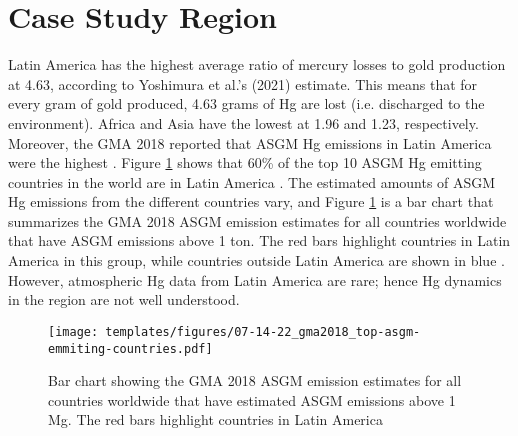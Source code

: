 \section{Case Study Region}
\begin{flushleft}
Latin America has the highest average ratio of mercury losses to gold production at 4.63, according to Yoshimura et al.'s (2021) estimate. This means that for every gram of gold produced, 4.63 grams of Hg are lost (i.e. discharged to the environment). Africa and Asia have the lowest at 1.96 and 1.23, respectively. Moreover, the GMA 2018 reported that ASGM Hg emissions in Latin America were the highest \cite{united_nations_environment_programme_technical_2019}. Figure \ref{fig:global_asgm_emissions_above_a_tone_barchart} shows that 60\% of the top 10 ASGM Hg emitting countries in the world are in Latin America  \cite{united_nations_environment_programme_technical_2019}. The estimated amounts of ASGM Hg emissions from the different countries vary, and Figure \ref{fig:global_asgm_emissions_above_a_tone_barchart} is a bar chart that summarizes the GMA 2018 ASGM \hg emission estimates for all countries worldwide that have ASGM \hg emissions above 1 ton. The red bars highlight countries in Latin America in this group, while countries outside Latin America are shown in blue  \cite{united_nations_environment_programme_technical_2019}. However, atmospheric Hg data from Latin America are rare; hence Hg dynamics in the region are not well understood. 
\end{flushleft}

\begin{figure}[H]
  \texttt{[image: templates/figures/07-14-22\_gma2018\_top-asgm-emmiting-countries.pdf]}
  \centering
  \caption[Bar chart showing the GMA 2018 ASGM \hg emission estimates for all countries worldwide that have estimated ASGM \hg emissions above 1 ton]{Bar chart showing the GMA 2018 ASGM \hg emission estimates for all countries worldwide that have estimated ASGM \hg emissions above 1 Mg. The red bars highlight countries in Latin America \cite{united_nations_environment_programme_technical_2019}}
  \label{fig:global_asgm_emissions_above_a_tone_barchart}
\end{figure}
\FloatBarrier

